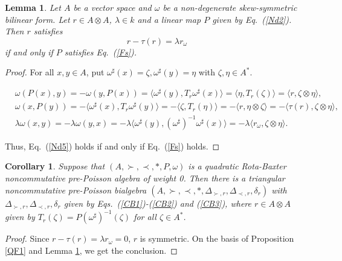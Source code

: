 \documentclass[12pt]{amsart}
\newtheorem{lem}[thm]{Lemma}
\newtheorem{cor}[thm]{Corollary}
\theoremstyle{definition}
\begin{document}
\begin{lem} \label{QF2} Let $A$ be a vector space and $\omega$ be a non-degenerate skew-symmetric bilinear form. 
Let $r\in A\otimes A$,
$\lambda\in k$ and a linear map $P$ given by Eq.~(\ref{Nd2}). Then $r$ satisfies
\begin{equation} \label{Nd5} r-\tau(r)=\lambda r_{\omega} \end{equation}
if and only if $P$ satisfies Eq.~(\ref{Fs}).
\end{lem}
\begin{proof} For all $x,y\in A$, put $\omega^{\sharp}(x)=\zeta,\omega^{\sharp}(y)=\eta$ with $\zeta,\eta\in A^{*}$.
\begin{small}
\begin{align*}& \omega(P(x),y)=-\omega(y,P(x))=\langle\omega^{\sharp}(y),T_{r}\omega^{\sharp}(x)\rangle
=\langle \eta,T_{r}(\zeta)\rangle
=\langle r,\zeta\otimes\eta\rangle,\\
&\omega(x,P(y))=-\langle \omega^{\sharp}(x),T_{r}\omega^{\sharp}(y)\rangle
=-\langle \zeta,T_{r}(\eta)\rangle
=-\langle r,\eta\otimes\zeta\rangle
=-\langle \tau(r),\zeta\otimes\eta\rangle,
\\
&\lambda\omega(x,y)=-\lambda \omega(y,x)
=-\lambda\langle \omega^{\sharp}(y),(\omega^{\sharp})^{-1}\omega^{\sharp}(x)\rangle
=-\lambda\langle r_{\omega},\zeta\otimes\eta\rangle
.\end{align*}\end{small}
Thus, Eq.~(\ref{Nd5}) holds if and only if Eq.~(\ref{Fs}) holds.
 \end{proof}
 
\begin{cor} \label{Fb3} Suppose that $(A, \succ,\prec,\ast,P,\omega)$ is a quadratic Rota-Baxter noncommutative pre-Poisson algebra of weight 0.
 Then there is a triangular
noncommutative pre-Poisson bialgebra $(A, \succ,\prec,\ast, \Delta_{\succ,r}, \Delta_{\prec,r},\delta_{r})$
 with $\Delta_{\succ,r}, \Delta_{\prec,r},\delta_{r}$ given
 by Eqs.~(\ref{CB1})-(\ref{CB2}) and (\ref{CB3}), where $r\in A\otimes A$ given by 
$T_{r}(\zeta)=P(\omega^{\sharp})^{-1}(\zeta)$ for all $\zeta\in A^{*}$.
\end{cor}

 \begin{proof} Since $r-\tau(r)=\lambda r_{\omega}=0$, $r$ is symmetric.
On the basis of Proposition \ref{QF1} and Lemma \ref{QF2}, we get the conclusion. \end{proof}
 
\end{document}
